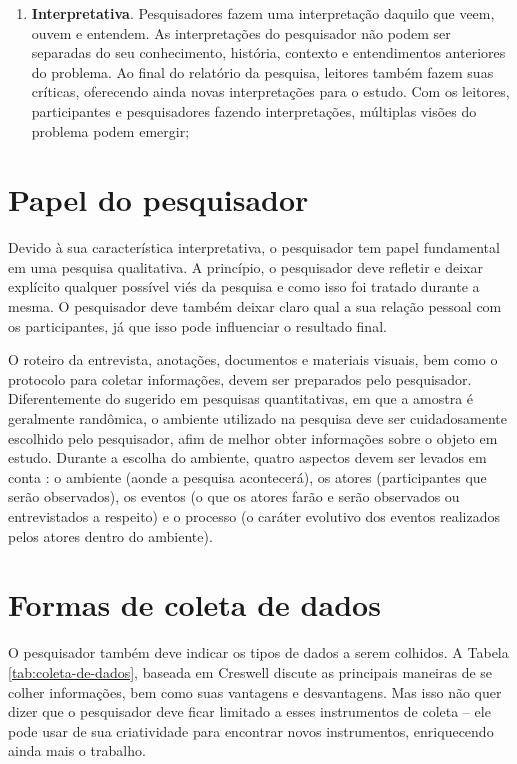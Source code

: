 \begin{enumerate}
  \item \textbf{Interpretativa}. Pesquisadores fazem uma interpretação daquilo
  que veem, ouvem e entendem. As interpretações do pesquisador não podem ser
  separadas do seu conhecimento, história, contexto e entendimentos anteriores
  do problema. Ao final do relatório da pesquisa, leitores também fazem suas
  críticas, oferecendo ainda novas interpretações para o estudo. Com os
  leitores, participantes e pesquisadores fazendo interpretações, múltiplas
  visões do problema podem emergir;
  
\end{enumerate} 

\section{Papel do pesquisador}

Devido à sua característica interpretativa, o pesquisador tem papel fundamental
em uma pesquisa qualitativa. A princípio, o pesquisador deve refletir e
deixar explícito qualquer possível viés da pesquisa e como isso foi tratado
durante a mesma. O pesquisador deve também deixar claro qual a sua relação
pessoal com os participantes, já que isso pode influenciar o resultado final.

O roteiro da entrevista, anotações, documentos e materiais visuais, bem como o
protocolo para coletar informações, devem ser preparados pelo pesquisador.
Diferentemente do sugerido em pesquisas quantitativas, em que a amostra é
geralmente randômica, o ambiente utilizado na pesquisa deve ser cuidadosamente
escolhido pelo pesquisador, afim de melhor obter informações sobre o objeto em
estudo. Durante a escolha do ambiente, quatro aspectos devem ser levados em
conta \cite{miles-and-huberman}: o ambiente (aonde a pesquisa acontecerá), os
atores (participantes que serão observados), os eventos (o que os atores farão e serão
observados ou entrevistados a respeito) e o processo (o caráter evolutivo dos
eventos realizados pelos atores dentro do ambiente).

\section{Formas de coleta de dados}

O pesquisador também deve indicar os tipos de dados a serem colhidos. A Tabela
\ref{tab:coleta-de-dados}, baseada em Creswell \cite{creswell} discute as
principais maneiras de se colher informações, bem como suas vantagens e
desvantagens. Mas isso não quer dizer que o pesquisador deve ficar limitado a
esses instrumentos de coleta -- ele pode usar de sua criatividade para encontrar
novos instrumentos, enriquecendo ainda mais o trabalho.

